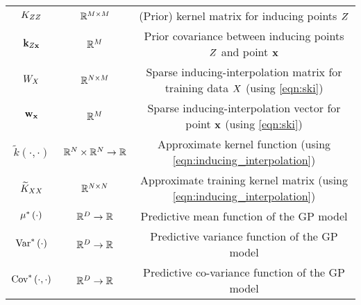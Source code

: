 \begin{table}[p!]
{\begin{tabular}{ ccc }
			$K_{ZZ}$ & $\mathbb{R}^{M \times M}$ & (Prior) kernel matrix for inducing points $Z$ \\
			$\mathbf{k}_{Z\mathbf{x}}$ & $\mathbb{R}^{M}$ & Prior covariance between inducing points $Z$ and point $\mathbf{x}$ \\
			$W_{X}$ & $\mathbb{R}^{N \times M}$ & Sparse inducing-interpolation matrix for training data $X$ (using \cref{eqn:ski}) \\
			$\mathbf{w}_{\mathbf{x}}$ & $\mathbb{R}^{M}$ & Sparse inducing-interpolation vector for point $\mathbf{x}$ (using \cref{eqn:ski}) \\
			\midrule
			$\widetilde k(\cdot, \cdot)$ & $\mathbb{R}^{N} \times \mathbb{R}^{N} \rightarrow \mathbb{R}$ & Approximate kernel function (using \cref{eqn:inducing_interpolation}) \\
			$\widetilde {K}_{XX}$ & $\mathbb{R}^{N \times N}$ & Approximate training kernel matrix (using \cref{eqn:inducing_interpolation}) \\
			\midrule
			$\mu^* \left(  \cdot  \right)$ & $\mathbb{R}^{D} \rightarrow \mathbb{R}$ & Predictive mean function of the GP model \\
			$\text{Var}^* \left(  \cdot  \right)$ & $\mathbb{R}^{D} \rightarrow \mathbb{R}$ & Predictive variance function of the GP model\\
      $\text{Cov}^* \left(  \cdot ,  \cdot  \right)$ & $\mathbb{R}^{D} \rightarrow \mathbb{R}$ & Predictive co-variance function of the GP model\\
			\bottomrule
		\end{tabular}
	}
\end{table}

\newpage
